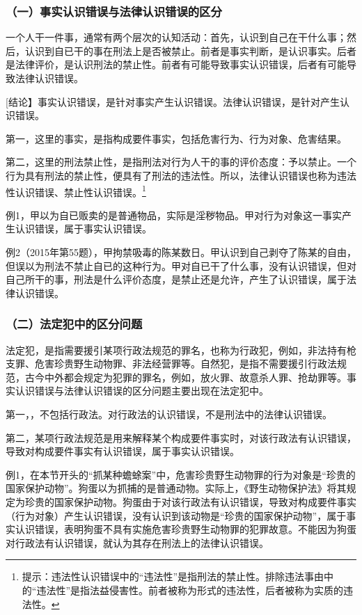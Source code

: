 \subsubsection*{（一）事实认识错误与法律认识错误的区分}

一个人干一件事，通常有两个层次的认知活动：首先，认识到自己在干什么事；然后，认识到自已干的事在刑法上是否被禁止。前者是事实判断，是认识事实。后者是法律评价，是认识刑法的禁止性。前者有可能导致事实认识错误，后者有可能导致法律认识错误。

[结论】事实认识错误，是针对事实产生认识错误。法律认识错误，是针对产生认识错误。

第一，这里的事实，是指构成要件事实，包括危害行为、行为对象、危害结果。

第二，这里的刑法禁止性，是指刑法对行为人干的事的评价态度：予以禁止。一个行为具有刑法的禁止性，便具有了刑法的违法性。所以，法律认识错误也称为违法性认识错误、禁止性认识错误。\footnote{提示：违法性认识错误中的“违法性”是指刑法的禁止性。排除违法事由中的“违法性”是指法益侵害性。前者被称为形式的违法性，后者被称为实质的违法性。}

例1，甲以为自已贩卖的是普通物品，实际是淫秽物品。甲对行为对象这一事实产生认识错误，属于事实认识错误。

例2（2015年第55题），甲拘禁吸毒的陈某数日。甲认识到自己剥夺了陈某的自由，但误以为刑法不禁止自已的这种行为。甲对自已干了什么事，没有认识错误，但对自己所干的事，刑法是什么评价态度，是禁止还是允许，产生了认识错误，属于法律认识错误。

\subsubsection*{（二）法定犯中的区分问题}

法定犯，是指需要援引某项行政法规范的罪名，也称为行政犯，例如，非法持有枪支罪、危害珍贵野生动物罪、非法经营罪等。自然犯，是指不需要援引行政法规范，古今中外都会规定为犯罪的罪名，例如，放火罪、故意杀人罪、抢劫罪等。事实认识错误与法律认识错误的区分问题主要出现在法定犯中。

第一，，不包括行政法。对行政法的认识错误，不是刑法中的法律认识错误。

第二，某项行政法规范是用来解释某个构成要件事实时，对该行政法有认识错误，导致对构成要件事实有认识错误，属于事实认识错误。

例1，在本节开头的“抓某种蟾蜍案”中，危害珍贵野生动物罪的行为对象是“珍贵的国家保护动物”。狗蛋以为抓捕的是普通动物。实际上，《野生动物保护法》将其规定为珍贵的国家保护动物。狗蛋由于对该行政法有认识错误，导致对构成要件事实（行为对象）产生认识错误，没有认识到该动物是“珍贵的国家保护动物”，属于事实认识错误，表明狗蛋不具有实施危害珍贵野生动物罪的犯罪故意。不能因为狗蛋对行政法有认识错误，就认为其存在刑法上的法律认识错误。

